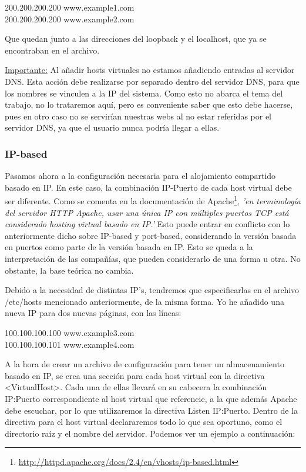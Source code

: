 \documentclass[a4paper, 10pt]{article} %
\begin{document}
200.200.200.200 www.example1.com\\
200.200.200.200 www.example2.com

Que quedan junto a las direcciones del loopback y el localhost, que ya se encontraban en el archivo. 

\underline{Importante:} Al añadir hosts virtuales no estamos añadiendo entradas al servidor DNS. Esta acción debe realizarse por separado dentro del servidor DNS, para que los nombres se vinculen a la IP del sistema. Como esto no abarca el tema del trabajo, no lo trataremos aquí, pero es conveniente saber que esto debe hacerse, pues en otro caso no se servirían nuestras webs al no estar referidas por el servidor DNS, ya que el usuario nunca podría llegar a ellas. 

\subsubsection{IP-based}

Pasamos ahora a la configuración necesaria para el alojamiento compartido basado en IP. En este caso, la combinación IP-Puerto de cada host virtual debe ser diferente. Como se comenta en la documentación de Apache\footnote{\url{http://httpd.apache.org/docs/2.4/en/vhosts/ip-based.html}}, \textit{'en terminología del servidor HTTP Apache, usar una única IP con múltiples puertos TCP está considerado hosting virtual basado en IP.'} Esto puede entrar en conflicto con lo anteriormente dicho sobre IP-based y port-based, considerando la versión basada en puertos como parte de la versión basada en IP. Esto se queda a la interpretación de las compañías, que pueden considerarlo de una forma u otra. No obstante, la base teórica no cambia. 

Debido a la necesidad de distintas IP's, tendremos que especificarlas en el archivo /etc/hosts mencionado anteriormente, de la misma forma. Yo he añadido una nueva IP para dos nuevas páginas, con las líneas:

100.100.100.100 www.example3.com \\
100.100.100.101 www.example4.com

A la hora de crear un archivo de configuración para tener un almacenamiento basado en IP, se crea una sección para cada host virtual con la directiva <VirtualHost>. Cada una de ellas llevará en su cabecera la combinación IP:Puerto correspondiente al host virtual que referencie, a la que además Apache debe escuchar, por lo que utilizaremos la directiva Listen IP:Puerto. Dentro de la directiva para el host virtual declararemos todo lo que sea oportuno, como el directorio raíz y el nombre del servidor. Podemos ver un ejemplo a continuación: 
\end{document}
